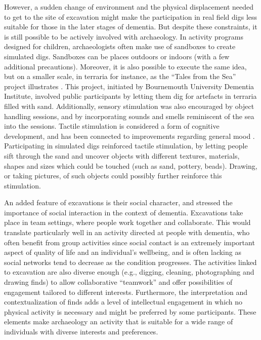 	However, a sudden change of environment and the physical displacement needed to get to the site of excavation might make the participation in real field digs less suitable for those in the later stages of dementia. But despite these constraints, it is still possible to be actively involved with archaeology. In activity programs designed for children, archaeologists often make use of sandboxes to create simulated digs. Sandboxes can be places outdoors or indoors (with a few additional precautions). Moreover, it is also possible to execute the same idea, but on a smaller scale, in terraria for instance, as the “Tales from the Sea” project illustrates \parencite{Cutler_2013}. This project, initiated by Bournemouth University Dementia Institute, involved public participants by letting them dig for artefacts in terraria filled with sand. Additionally, sensory stimulation was also encouraged by object handling sessions, and by incorporating sounds and smells reminiscent of the sea into the sessions. Tactile stimulation is considered a form of cognitive development, and has been connected to improvements regarding general mood \parencite[471--472, 474--475]{Baker_2003}. Participating in simulated digs reinforced tactile stimulation, by letting people sift through the sand and uncover objects with different textures, materials, shapes and sizes which could be touched (such as sand, pottery, beads). Drawing, or taking pictures, of such objects could possibly further reinforce this stimulation.
	
	An added feature of excavations is their social character, and \textcite[271, 278, 281]{Kitwood_1992} stressed the importance of social interaction in the context of dementia. Excavations take place in team settings, where people work together and collaborate. This would translate particularly well in an activity directed at people with dementia, who often benefit from group activities since social contact is an extremely important aspect of quality of life and an individual’s wellbeing, and is often lacking as social networks tend to decrease as the condition progresses.  The activities linked to excavation are also diverse enough (e.g., digging, cleaning, photographing and drawing finds) to allow collaborative “teamwork” and offer possibilities of engagement tailored to different interests. Furthermore, the interpretation and contextualization of finds adds a level of intellectual engagement in which no physical activity is necessary and might be preferred by some participants. These elements make archaeology an activity that is suitable for a wide range of individuals with diverse interests and preferences.
	
